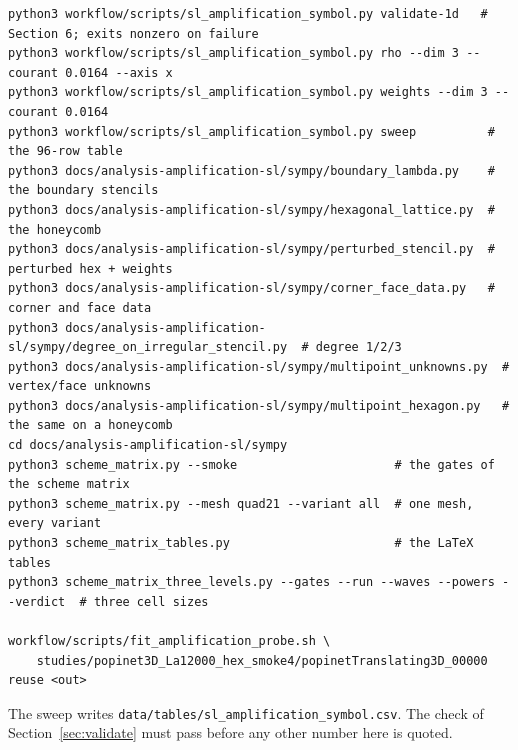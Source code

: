 \documentclass[11pt,a4paper]{article}
\newcommand{\tables}{data/tables}
\begin{document}
\begin{verbatim}
python3 workflow/scripts/sl_amplification_symbol.py validate-1d   # Section 6; exits nonzero on failure
python3 workflow/scripts/sl_amplification_symbol.py rho --dim 3 --courant 0.0164 --axis x
python3 workflow/scripts/sl_amplification_symbol.py weights --dim 3 --courant 0.0164
python3 workflow/scripts/sl_amplification_symbol.py sweep          # the 96-row table
python3 docs/analysis-amplification-sl/sympy/boundary_lambda.py    # the boundary stencils
python3 docs/analysis-amplification-sl/sympy/hexagonal_lattice.py  # the honeycomb
python3 docs/analysis-amplification-sl/sympy/perturbed_stencil.py  # perturbed hex + weights
python3 docs/analysis-amplification-sl/sympy/corner_face_data.py   # corner and face data
python3 docs/analysis-amplification-sl/sympy/degree_on_irregular_stencil.py  # degree 1/2/3
python3 docs/analysis-amplification-sl/sympy/multipoint_unknowns.py  # vertex/face unknowns
python3 docs/analysis-amplification-sl/sympy/multipoint_hexagon.py   # the same on a honeycomb
cd docs/analysis-amplification-sl/sympy
python3 scheme_matrix.py --smoke                      # the gates of the scheme matrix
python3 scheme_matrix.py --mesh quad21 --variant all  # one mesh, every variant
python3 scheme_matrix_tables.py                       # the LaTeX tables
python3 scheme_matrix_three_levels.py --gates --run --waves --powers --verdict  # three cell sizes

workflow/scripts/fit_amplification_probe.sh \
    studies/popinet3D_La12000_hex_smoke4/popinetTranslating3D_00000 reuse <out>
\end{verbatim}

The sweep writes \texttt{\tables/sl\_amplification\_symbol.csv}. The check of
Section~\ref{sec:validate} must pass before any other number here is quoted.
\end{document}

